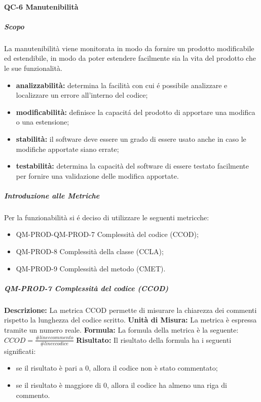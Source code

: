 		\paragraph{QC-6 Manutenibilità}
			\subparagraph{Scopo}
				La manutenibilità viene monitorata in modo da fornire un prodotto modificabile ed estendibile, in modo da poter estendere facilmente sia la vita del prodotto che le sue funzionalità.
				\begin{itemize}
					\item \textbf{analizzabilità:} determina la facilità con cui é possibile analizzare e localizzare un errore all'interno del codice;
					\item \textbf{modificabilità:} definisce la capacitá del prodotto di apportare una modifica o una estensione;
					\item \textbf{stabilità:} il software deve essere un grado di essere usato anche in caso le modifiche apportate siano errate;
					\item \textbf{testabilità:} determina la capacità del software di essere testato facilmente per fornire una validazione delle modifica apportate.
				\end{itemize}
			\subparagraph{Introduzione alle Metriche}
				Per la funzionabilità si é deciso di utilizzare le seguenti metricche:
				\begin{itemize}
					\item QM-PROD-QM-PROD-7 Complessità del codice (CCOD);
					\item QM-PROD-8 Complessità della classe (CCLA);
					\item QM-PROD-9 Complessità del metodo (CMET).
				\end{itemize}
			\subparagraph{QM-PROD-7 Complessità del codice (CCOD)}
				\textbf{Descrizione: }
					La metrica CCOD permette di misurare la chiarezza dei commenti rispetto la lunghezza del codice scritto.
				\textbf{Unità di Misura: }
					La metrica è espressa tramite un numero reale.
				\textbf{Formula: }
					La formula della metrica è la seguente:
				 \(
				 		CCOD = \frac{\# linee commento}{\# linee codice}
				 \)
				\textbf{Risultato: }
					Il risultato della formula ha i seguenti significati:
					\begin{itemize}
						\item se il risultato è pari a 0, allora il codice non è stato commentato;
						\item se il risultato è maggiore di 0, allora il codice ha almeno una riga di commento.
					\end{itemize}
